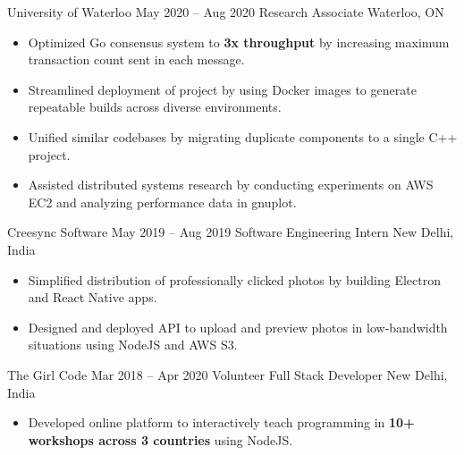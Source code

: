 \documentclass{article}
\begin{document}
\iffalse
Accelerated research in the field of Byzantine fault tolerant distributed computing, by implementing security features (like BLS signature verification), streamlining build and deployment of project using Docker, and reducing technical debt by standardizing use of external dependencies. Conducted performance benchmarks on AWS and analyzed performance data using gnuplot and Python.
\fi
\WorkEntry
{University of Waterloo}
{May 2020 -- Aug 2020}
{Research Associate \hfill Waterloo, ON}
{\begin{itemize} \itemsep -1pt
    \item Optimized Go consensus system to \textbf{3x throughput} by increasing maximum transaction count sent in each message.
    \item Streamlined deployment of project by using Docker images to generate repeatable builds across diverse environments.
    \item Unified similar codebases by migrating duplicate components to a single  C++ project.
    \item Assisted distributed systems research by conducting experiments on AWS EC2 and analyzing performance data in gnuplot.
    \end{itemize}}
\iffalse
Designed and build native apps for professional photographers to deliver photos to clients, using Electron and React Native, and created API to preview uploaded photos in low-bandwidth situations, using NodeJS and AWS S3. Reduced technical debt in React Native project by combining similar functionality into reusable components.
\fi
\WorkEntry
{Creesync Software}
{May 2019 -- Aug 2019}
{Software Engineering Intern \hfill New Delhi, India}
{\begin{itemize} \itemsep -1pt
    \item Simplified distribution of professionally clicked photos by building Electron and React Native apps.
    \item Designed and deployed API to upload and preview photos in low-bandwidth situations using NodeJS and AWS S3.
    \end{itemize}}
\WorkEntry
{The Girl Code}
{Mar 2018 -- Apr 2020}
{Volunteer Full Stack Developer \hfill New Delhi, India}
{\begin{itemize} \itemsep -1pt
	\item Developed online platform to interactively teach programming in \textbf{10+ workshops across 3 countries} using NodeJS.
    \end{itemize}}
\end{document}
